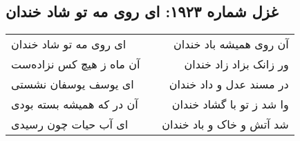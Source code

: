 \begin{center}
\section*{غزل شماره ۱۹۲۳: ای روی مه تو شاد خندان}
\label{sec:1923}
\begin{longtable}{l p{0.5cm} r}
ای روی مه تو شاد خندان
&&
آن روی همیشه باد خندان
\\
آن ماه ز هیچ کس نزاده‌ست
&&
ور زانک بزاد زاد خندان
\\
ای یوسف یوسفان نشستی
&&
در مسند عدل و داد خندان
\\
آن در که همیشه بسته بودی
&&
وا شد ز تو با گشاد خندان
\\
ای آب حیات چون رسیدی
&&
شد آتش و خاک و باد خندان
\\
\end{longtable}
\end{center}
